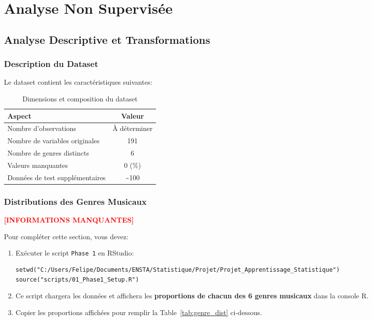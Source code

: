 \documentclass[11pt,a4paper,french]{report}
\begin{document}

\chapter{Analyse Non Supervisée}

\section{Analyse Descriptive et Transformations}

\subsection{Description du Dataset}

Le dataset contient les caractéristiques suivantes:

\begin{table}[H]
\centering
\caption{Dimensions et composition du dataset}
\begin{tabular}{|l|c|}
\hline
\textbf{Aspect} & \textbf{Valeur} \\
\hline
Nombre d'observations & À déterminer \\
Nombre de variables originales & 191 \\
Nombre de genres distincts & 6 \\
Valeurs manquantes & 0 (\%) \\
Données de test supplémentaires & \textasciitilde 100 \\
\hline
\end{tabular}
\label{tab:dataset_dims}
\end{table}

\subsection{Distributions des Genres Musicaux}

\textcolor{red}{\textbf{[INFORMATIONS MANQUANTES]}}

Pour compléter cette section, vous devez:

\begin{enumerate}
    \item Exécuter le script \texttt{Phase 1} en RStudio:
    \begin{lstlisting}
setwd("C:/Users/Felipe/Documents/ENSTA/Statistique/Projet/Projet_Apprentissage_Statistique")
source("scripts/01_Phase1_Setup.R")
    \end{lstlisting}
    
    \item Ce script chargera les données et affichera les \textbf{proportions de chacun des 6 genres musicaux} dans la console R.
    
    \item Copier les proportions affichées pour remplir la Table~\ref{tab:genre_dist} ci-dessous.
\end{enumerate}
\end{document}
